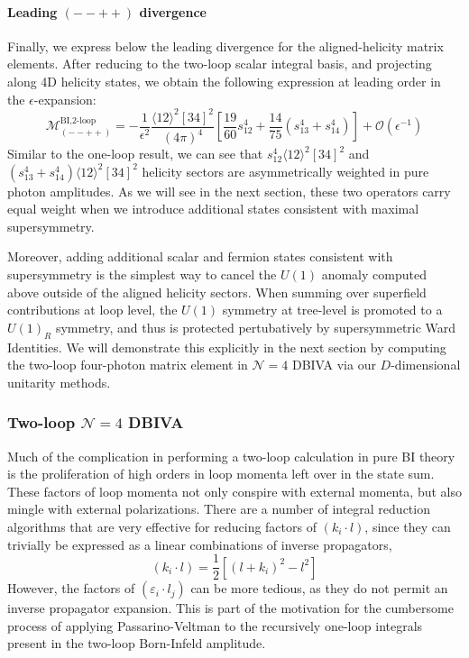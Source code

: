 \documentclass[12pt,letter]{article}
\def\be{\begin{equation}}
\def\ee{\end{equation}}
\begin{document}
\paragraph{Leading $(--++)$ divergence} 
Finally, we express below the leading divergence for the aligned-helicity matrix elements. After reducing to the two-loop scalar integral basis, and projecting along 4D helicity states, we obtain the following expression at leading order in the $\epsilon$-expansion:
\be
\boxed{\mathcal{M}^{\text{BI,2-loop}}_{(--++)} = -\frac{1}{\epsilon^2}\frac{\langle12\rangle^2[34]^2}{(4\pi)^4}\left[\frac{19}{60}s_{12}^4+\frac{14}{75}(s_{13}^4+s_{14}^4)\right]+\mathcal{O}(\epsilon^{-1})}
\ee
Similar to the one-loop result, we can see that $s_{12}^4 \langle12\rangle^2[34]^2$ and $(s_{13}^4+s_{14}^4)\langle12\rangle^2[34]^2$ helicity sectors are asymmetrically weighted in pure photon amplitudes. As we will see in the next section, these two operators carry equal weight when we introduce additional states consistent with maximal supersymmetry. 

Moreover, adding additional scalar and fermion states consistent with supersymmetry is the simplest way to cancel the $U(1)$ anomaly computed above outside of the aligned helicity sectors. When summing over superfield contributions at loop level, the $U(1)$ symmetry at tree-level is promoted to a $U(1)_R$ symmetry, and thus is protected pertubatively by supersymmetric Ward Identities. We will demonstrate this explicitly in the next section by computing the two-loop four-photon matrix element in $\mathcal{N}=4$ DBIVA via our $D$-dimensional unitarity methods. 

\subsubsection{Two-loop $\mathcal{N}=4$ DBIVA}\label{sec:2loopN4U}
Much of the complication in performing a two-loop calculation in pure BI theory is the proliferation of high orders in loop momenta left over in the state sum. These factors of loop momenta not only conspire with external momenta, but also mingle with external polarizations. There are a number of integral reduction algorithms \cite{Anastasiou:2004vj,vonManteuffel:2012np,Smirnov:2014hma,vonManteuffel:2014ixa,Smirnov:2019qkx,Smirnov:2020quc,Usovitsch:2020jrk,Maierhofer:2018gpa} that are very effective for reducing factors of $(k_i \cdot l)$, since they can trivially be expressed as a linear combinations of inverse propagators,
\be
(k_i \cdot l) = \frac{1}{2}\left[(l+k_i)^2-l^2\right]
\ee
However, the factors of $(\varepsilon_i\cdot l_j)$ can be more tedious, as they do not permit an inverse propagator expansion. This is part of the motivation for the cumbersome process of applying Passarino-Veltman to the recursively one-loop integrals present in the two-loop Born-Infeld amplitude.  
\end{document}
